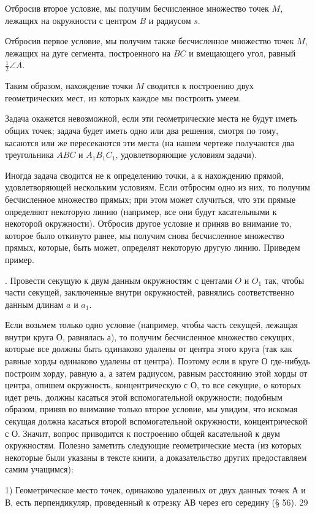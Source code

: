 Отбросив второе условие, мы получим бесчисленное множество точек $M$, лежащих на окружности с центром $B$ и радиусом $s$.

Отбросив первое условие, мы получим также бесчисленное множество точек $M$, лежащих на дуге сегмента, построенного на $BC$ и вмещающего угол, равный $\tfrac12\angle A$.

Таким образом, нахождение точки $M$ сводится к построению двух геометрических мест, из которых каждое мы построить умеем.

Задача окажется невозможной, если эти геометрические места не будут иметь общих точек; задача будет иметь одно или два решения, смотря по тому, касаются или же пересекаются эти места (на нашем чертеже получаются два треугольника $ABC$ и $A_1B_1C_1$, удовлетворяющие условиям задачи).

Иногда задача сводится не к определению точки, а к нахождению прямой, удовлетворяющей нескольким условиям. Если отбросим одно из них, то получим бесчисленное множество прямых; при этом может случиться, что эти прямые определяют некоторую линию (например, все они будут касательными к некоторой окружности). Отбросив другое условие и приняв во внимание то, которое было откинуто ранее, мы получим снова бесчисленное множество прямых, которые, быть может, определят некоторую другую линию. Приведем пример.

. Провести секущую к двум данным окружностям с центами $O$ и $O_1$ так, чтобы части секущей, заключенные внутри окружностей, равнялись соответственно данным длинам $a$ и $a_1$.

Если возьмем только одно условие (например, чтобы часть секущей, лежащая внутри круга О, равнялась а), то получим бесчисленное множество секущих, которые все должны быть одинаково удалены от центра этого круга (так как равные хорды одинаково удалены от центра).
Поэтому если в круге О где-нибудь построим хорду, равную а, а затем радиусом, равным расстоянию этой хорды от центра, опишем окружность, концентрическую с О, то все секущие, о которых идет речь, должны касаться этой вспомогательной окружности; подобным образом, приняв во внимание только второе условие, мы увидим, что искомая секущая должна касаться второй вспомогательной окружности, концентрической с О.
Значит, вопрос приводится к построению общей касательной к двум окружностям.
Полезно заметить следующие геометрические места (из которых некоторые были указаны в тексте книги, а доказательство других предоставляем самим учащимся):

1) Геометрическое место точек, одинаково удаленных от двух данных точек А и В, есть перпендикуляр, проведенный к отрезку АВ через его середину (§ 56).
29

